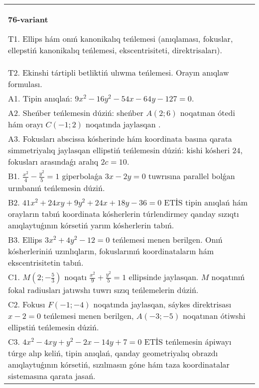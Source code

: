 \documentclass{article}
\begin{document}
\begin{tabular}{m{17cm}}
\textbf{76-variant}
\newline

T1. Ellips hám onıń kanonikalıq teńlemesi (anıqlaması, fokuslar, ellepstiń kanonikalıq teńlemesi, ekscentrisiteti, direktrisaları).\\

T2. Ekinshi tártipli betliktiń ulıwma teńlemesi. Orayın anıqlaw formulası.\\

A1. Tipin anıqlań: $9 x^{2}-16 y^{2}-54 x-64 y-127=0$.\\

A2. Sheńber teńlemesin dúziń: sheńber $A (2;6 ) $ noqatınan ótedi hám orayı $C (-1;2) $ noqatında jaylasqan .\\

A3. Fokusları abscissa kósherinde hám koordinata basına qarata simmetriyalıq jaylasqan ellipstiń teńlemesin dúziń: kishi kósheri $24$, fokusları arasındaǵı aralıq $2 c=10$.\\

B1. $\frac{x^{2}}{4} - \frac{y^{2}}{5} = 1$ giperbolaǵa $3x - 2y = 0$ tuwrısına parallel bolǵan urınbanıń teńlemesin dúziń.  \\

B2. $41x^{2} + 24xy + 9y^{2} + 24x + 18y - 36 = 0$ ETİS tipin anıqlań hám orayların tabıń koordinata kósherlerin túrlendirmey qanday sızıqtı anıqlaytuǵının kórsetiń yarım kósherlerin tabıń.  \\

B3. Ellips $3x^{2} + 4y^{2} - 12 = 0$ teńlemesi menen berilgen. Onıń kósherleriniń uzınlıqların, fokuslarınıń koordinataların hám ekscentrisitetin tabıń.  \\

C1. $M(2; - \frac{5}{3})$ noqatı $\frac{x^{2}}{9} + \frac{y^{2}}{5} = 1$ ellipsinde jaylasqan. $M$ noqatınıń fokal radiusları jatıwshı tuwrı sızıq teńlemelerin dúziń.  \\

C2. Fokusı $F( - 1; - 4)$ noqatında jaylasqan, sáykes direktrisası $x - 2 = 0$ teńlemesi menen berilgen, $A( - 3; - 5)$ noqatınan ótiwshi ellipstiń teńlemesin dúziń.  \\

C3. $4x^{2} - 4xy + y^{2} - 2x - 14y + 7 = 0$ ETİS teńlemesin ápiwayı túrge alıp keliń, tipin anıqlań, qanday geometriyalıq obrazdı anıqlaytuǵının kórsetiń, sızılmasın góne hám taza koordinatalar sistemasına qarata jasań.  \\

\end{tabular}
\vspace{1cm}
\end{document}
